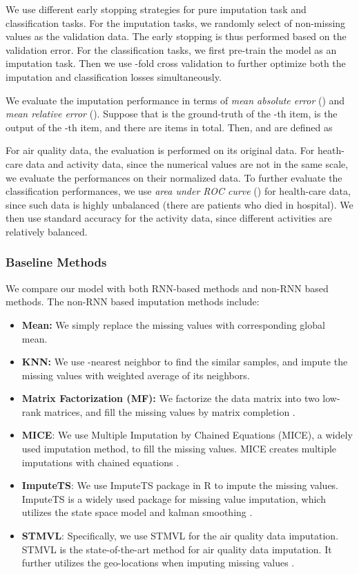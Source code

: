 \documentclass{article}
\begin{document}
We use different early stopping strategies for pure imputation task and classification tasks. For the imputation tasks, we randomly select  of non-missing values as the validation data. The early stopping is thus performed based on the validation error.
For the classification tasks, we first pre-train the model as an imputation task. Then we use -fold cross validation to further optimize both the imputation and classification losses simultaneously.



We evaluate the imputation performance
in terms of {\em mean absolute error} () and {\em mean relative error} (). Suppose that  is the ground-truth of the -th  item,  is the output of the -th item, and 
there are  items in total. Then,  and  are defined as

For air quality data, the evaluation is performed on its original data. For
 heath-care data and activity data, since the numerical values are not in the same scale, we evaluate the performances on their normalized data. To further evaluate the classification performances, we use {\em area under ROC curve} () \cite{bradley1997use} for health-care data, since such data is highly unbalanced (there are  patients who died in hospital). We then use standard accuracy for the activity data, since different activities are relatively balanced.
 
\subsubsection{Baseline Methods}
We compare our model with both RNN-based methods and non-RNN based methods. The non-RNN based imputation methods include:
\begin{itemize}
\item {\bf Mean:} We simply replace the missing values with corresponding global mean.
\item {\bf KNN:} We use -nearest neighbor \cite{friedman2001elements} to find the similar samples, and impute the missing values with  weighted average of its neighbors. 
\item {\bf Matrix Factorization (MF):} We factorize the data matrix into two low-rank matrices, and fill the missing values by matrix completion \cite{friedman2001elements}.

\item {\bf MICE}: We use Multiple Imputation by Chained Equations (MICE), a widely used imputation method, to fill the missing values. MICE creates multiple imputations with chained equations \cite{azur2011multiple}.

\item {\bf ImputeTS}: We use ImputeTS package in R to impute the missing values. ImputeTS is a widely used package for missing value imputation, which utilizes the state space model and kalman smoothing \cite{RJ-2017-009}.

\item {\bf STMVL}: Specifically, we use STMVL for  the air quality data imputation. STMVL is the state-of-the-art method for air quality data imputation. It further utilizes the geo-locations when imputing missing values  \cite{yi2016st}.
\end{itemize}
\end{document}
